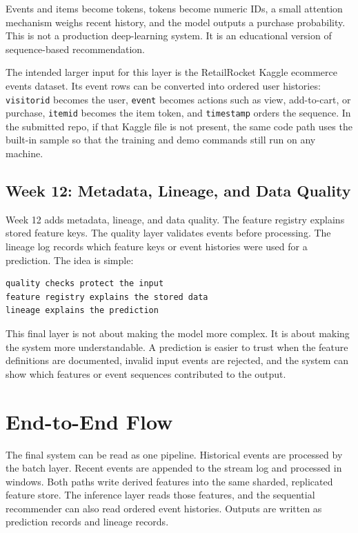 Events and items become tokens, tokens become numeric IDs, a small attention
mechanism weighs recent history, and the model outputs a purchase probability.
This is not a production deep-learning system. It is an educational version of
sequence-based recommendation.

The intended larger input for this layer is the RetailRocket Kaggle ecommerce
events dataset. Its event rows can be converted into ordered user histories:
\texttt{visitorid} becomes the user, \texttt{event} becomes actions such as
view, add-to-cart, or purchase, \texttt{itemid} becomes the item token, and
\texttt{timestamp} orders the sequence. In the submitted repo, if that Kaggle
file is not present, the same code path uses the built-in sample so that the
training and demo commands still run on any machine.

\subsection{Week 12: Metadata, Lineage, and Data Quality}

Week 12 adds metadata, lineage, and data quality. The feature registry explains
stored feature keys. The quality layer validates events before processing. The
lineage log records which feature keys or event histories were used for a
prediction. The idea is simple:

\begin{lstlisting}
quality checks protect the input
feature registry explains the stored data
lineage explains the prediction
\end{lstlisting}

This final layer is not about making the model more complex. It is about making
the system more understandable. A prediction is easier to trust when the feature
definitions are documented, invalid input events are rejected, and the system can
show which features or event sequences contributed to the output.

\section{End-to-End Flow}\label{sec:flow}

The final system can be read as one pipeline. Historical events are processed by
the batch layer. Recent events are appended to the stream log and processed in
windows. Both paths write derived features into the same sharded, replicated
feature store. The inference layer reads those features, and the sequential
recommender can also read ordered event histories. Outputs are written as
prediction records and lineage records.


